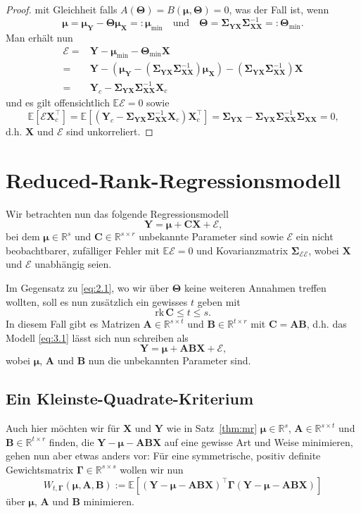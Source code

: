 \documentclass[]{article}
\newcommand{\E}{\mathbb{E}}
\newcommand{\R}{\mathbb{R}}
\newcommand{\X}{\mathbf{X}}
\newcommand{\Y}{\mathbf{Y}}
\newcommand{\T}{\mathbf{\Theta}}
\newcommand{\muu}{\bm{\mu}}
\newcommand{\Ssigma}{\mathbf{\Sigma}}
\newcommand{\C}{\mathbf{C}}
\newcommand{\rk}{\mathrm{rk}}
\newcommand{\A}{\mathbf{A}}
\newcommand{\B}{\mathbf{B}}
\newcommand{\Ggamma}{\mathbf{\Gamma}}
\begin{document}
\begin{proof}
	mit Gleichheit falls $A(\T) = B(\muu, \T) = 0$, was der Fall ist, wenn
	$$ \muu = \muu_\Y - \T \muu_\X =: \muu_{\min} \quad \text{und} \quad \T = \Ssigma_{\Y\X} \Ssigma_{\X\X}^{-1} =: \T_{\min} \text{.}$$
	Man erhält nun
	\begin{align*}
		\mathcal{E} ={}& \Y - \muu_{\min} - \T_{\min} \X \\
		={}& \Y - (\muu_\Y - (\Ssigma_{\Y\X} \Ssigma_{\X\X}^{-1}) \muu_\X) - (\Ssigma_{\Y\X} \Ssigma_{\X\X}^{-1}) \X \\
		={}& \Y_c - \Ssigma_{\Y\X} \Ssigma_{\X\X}^{-1} \X_c
	\end{align*}
	und es gilt offensichtlich $\E \mathcal{E} = 0$ sowie
	$$\E[\mathcal{E} \X_c^\top] = \E[(\Y_c - \Ssigma_{\Y\X} \Ssigma_{\X\X}^{-1} \X_c) \X_c^\top] = \Ssigma_{\Y\X} - \Ssigma_{\Y\X}\Ssigma_{\X\X}^{-1} \Ssigma_{\X\X} = 0 \text{,}$$
	d.h. $\X$ und $\mathcal{E}$ sind unkorreliert.
\end{proof}

\section{Reduced-Rank-Regressionsmodell}

Wir betrachten nun das folgende Regressionsmodell
\[\Y = \muu + \C \X + \mathcal{E} \text{,} \label{eq:3.1} \tag{3.1}\]
bei dem $\muu \in \R^s$ und $\C \in \R^{s \times r}$ unbekannte Parameter sind sowie $\mathcal{E}$ ein nicht beobachtbarer, zufälliger Fehler mit $\E \mathcal{E} = 0$ und Kovarianzmatrix $\Ssigma_{\mathcal{E} \mathcal{E}}$, wobei $\X$ und $\mathcal{E}$ unabhängig seien. 

Im Gegensatz zu \eqref{eq:2.1}, wo wir über $\T$ keine weiteren Annahmen treffen wollten, soll es nun zusätzlich ein gewisses $t$ geben mit
$$ \rk \, \C \leq t \leq s \text{.}$$
In diesem Fall gibt es Matrizen $\A \in \R^{s \times t}$ und $\B \in \R^{t \times r}$ mit $\C = \A \B$, d.h. das Modell \eqref{eq:3.1}
lässt sich nun schreiben als
\[\Y = \muu + \A \B \X + \mathcal{E} \text{,} \label{eq:3.2} \tag{3.2}\]
wobei $\muu$, $\A$ und $\B$ nun die unbekannten Parameter sind.

\subsection*{Ein Kleinste-Quadrate-Kriterium}

Auch hier möchten wir für $\X$ und $\Y$ wie in Satz~\ref{thm:mr} $\muu \in \R^s$, $\A \in \R^{s \times t}$ und $\B \in \R^{t \times r}$ finden, die $\Y - \muu - \A \B \X$ auf eine gewisse Art und Weise minimieren, gehen nun aber etwas anders vor:
Für eine symmetrische, positiv definite Gewichtsmatrix $\Ggamma \in \R^{s \times s}$ wollen wir nun 
$$ W_{t, \Ggamma}(\muu, \A, \B) := \E[(\Y - \muu - \A \B \X)^{\top} \Ggamma (\Y - \muu - \A \B \X)]$$
über $\muu$, $\A$ und $\B$ minimieren.
\end{document}
